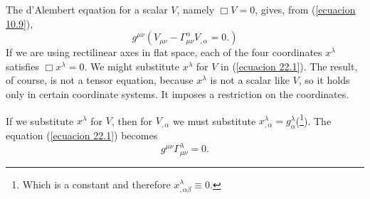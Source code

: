 The d'Alembert equation for a scalar $V$, namely $\Box V = 0$, gives, from (\ref{ecuacion 10.9}),
\begin{equation}
 \label{ecuacion 22.1}
 g^{\mu\nu}\left(
    V_{\mu\nu} - \Gamma^\alpha_{\mu\nu} V_{,\alpha} = 0.
 \right)
\end{equation}
If we are using rectilinear axes in flat space, each of the four coordinates $x^\lambda$ satisfies $\Box x^\lambda = 
0$. We might substitute $x^\lambda$ for $V$ in (\ref{ecuacion 22.1}). The result, of course, is not a tensor equation, 
because $x^\lambda$ is not a scalar like $V$, so it holds only in certain coordinate systems. It imposes a restriction 
on the coordinates.

If we substitute $x^\lambda$ for $V$, then for $V_{,\alpha}$ we must substitute $x^\lambda_{,\alpha} = 
g^\lambda_{\alpha}$(\footnote{Which is a constant and therefore $x^\lambda_{,\alpha\beta}\equiv 0$.}). The equation 
(\ref{ecuacion 22.1}) becomes
\begin{equation}
 \label{ecuacion 22.2}
 g^{\mu\nu} \Gamma^\lambda_{\mu\nu} = 0.
\end{equation}


